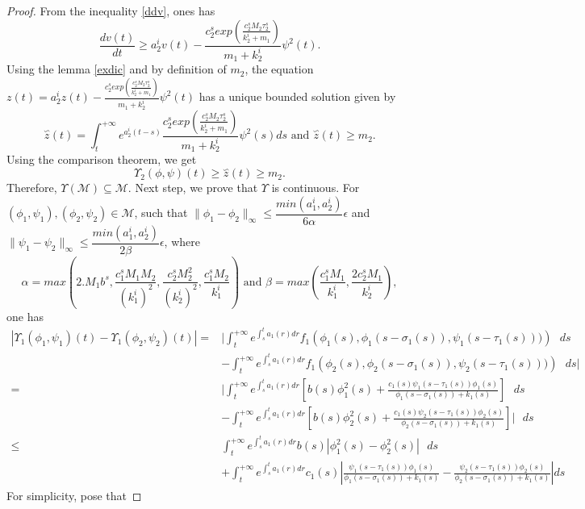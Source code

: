 \documentclass[[a4paper,10pt]{article}
\begin{document}
\begin{proof}
 From the inequality \eqref{ddv}, ones has
$$\dfrac{dv(t)}{dt}\geq a_2^iv(t)-\frac{c_2^sexp\left(\frac{c_2^s M_2\tau_2^s}{k_2^i+m_1}\right)}{m_1+k_2^i}\psi^2(t).$$
Using the  lemma \ref{exdic} and by definition of $m_2$, the equation $z(t)=a_2^iz(t)-\frac{c_2^sexp\left(\frac{c_2^s M_2\tau_2^s}{k_2^i+m_1}\right)}{m_1+k_2^i}\psi^2(t)$ has a unique bounded solution given by 
$$\overset{\backsim}z(t)=\int^{+\infty}_t e^{a^i_2(t-s)}\frac{c_2^s exp\left(\frac{c_2^s M_2\tau_2^s}{k_2^i+m_1}\right)}{m_1+k_2^i}\psi^2(s)ds \text{ and }\overset{\backsim}z(t)\geq m_2 .$$
Using the comparison theorem, we get 
$$\Upsilon_2(\phi,\psi)(t)\geq \overset{\backsim}z(t)\geq m_2.$$
  Therefore, $\Upsilon(\mathcal{M})\subseteq \mathcal{M}$.
  Next step, we prove that $\Upsilon$ is continuous. For $(\phi_1,\psi_1), (\phi_2,\psi_2)\in \mathcal{M}$, such that $\|\phi_1-\phi_2\|_\infty\leq\dfrac{min(a^i_1,a^i_2)}{6\alpha} \epsilon$ and  $\|\psi_1-\psi_2\|_\infty\leq \dfrac{min(a^i_1,a^i_2)}{2\beta} \epsilon$, where
 $$\alpha=max\left(2.M_1 b^s,\frac{c_1^s M_1 M_2}{(k^i_1)^2},\frac{c_2^sM_2^2}{(k^i_2)^2},\frac{c_1^sM_2}{k^i_1}\right) \text{ and }\beta=max\left( \frac{c_1^sM_1}{k^i_1}, \frac{2c_2^s M_1}{k^i_2}\right),$$
one has
 {\small\begin{align*}
  |\Upsilon_1(\phi_1,\psi_1)(t)-\Upsilon_1(\phi_2,\psi_2)(t)|=& \displaystyle{\bigg|\int_t^{+\infty} e^{\int^t_s a_1(r)dr}f_1\left(\phi_1(s),\phi_1(s-\sigma_1(s)),\psi_1(s-\tau_1(s)))\right)\text{ } ds}\\
  &\displaystyle{-\int_t^{+\infty} e^{\int^t_s a_1(r)dr}f_1\left(\phi_2(s),\phi_2(s-\sigma_1(s)),\psi_2(s-\tau_1(s)))\right)\text{ } ds\bigg|}\\
  =&{\displaystyle{\bigg|\int_t^{+\infty} e^{\int^t_s a_1(r)dr}}}\left[b(s)\phi_1^2(s)+\frac{c_1(s)\psi_1(s-\tau_1(s))\phi_1(s)}{\phi_1(s-\sigma_1(s))+k_1(s)}\right]\text{ } ds\\
  &{\displaystyle{-\int_t^{+\infty} e^{\int^t_s a_1(r)dr}}}\left[b(s)\phi_2^2(s)+\frac{c_1(s)\psi_2(s-\tau_1(s))\phi_2(s)}{\phi_2(s-\sigma_1(s))+k_1(s)}\right]\bigg|\text{ } ds\\
   \leq&\displaystyle{\int_t^{+\infty} e^{\int^t_s a_1(r)dr}}b(s)\left|\phi_1^2(s)-\phi_2^2(s)\right|\text{ } ds\\
&{\displaystyle{+\int_t^{+\infty} e^{\int^t_s a_1(r)dr}c_1(s)}}
  \left|\frac{\psi_1(s-\tau_1(s))\phi_1(s)}{\phi_1(s-\sigma_1(s))+k_1(s)}-
\frac{\psi_2(s-\tau_1(s))\phi_2(s)}{\phi_2(s-\sigma_1(s))+k_1(s)}\right|ds
  \end{align*}}
  For simplicity, pose that 

\end{proof}
\end{document}
